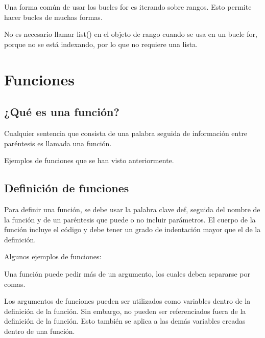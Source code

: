 \documentclass{report}
\begin{document}
{Una forma común de usar los bucles for es iterando sobre rangos. Esto permite hacer bucles de muchas formas.


No es necesario llamar list() en el objeto de rango cuando se usa en un bucle for, porque no se está indexando, por lo que no requiere una lista.


\clearpage\chapter{Funciones}

\section{¿Qué es una función?}

Cualquier sentencia que consista de una palabra seguida de información entre paréntesis es llamada una función.

Ejemplos de funciones que se han visto anteriormente.


\section{Definición de funciones}

Para definir una función, se debe usar la palabra clave def, seguida del nombre de la función y de un paréntesis que puede o no incluir parámetros. El cuerpo de la función incluye el código y debe tener un grado de indentación mayor que el de la definición.

Algunos ejemplos de funciones:



Una función puede pedir más de un argumento, los cuales deben separarse por comas.



Los argumentos de funciones pueden ser utilizados como variables dentro de la definición de la función. Sin embargo, no pueden ser referenciados fuera de la definición de la función. Esto también se aplica a las demás variables creadas dentro de una función.

}
\end{document}
